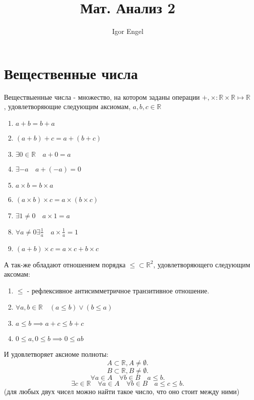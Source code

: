 \documentclass[11pt, oneside]{article}   	%
\title{Мат. Анализ 2}
\author{Igor Engel}
\date{}
\begin{document}
\maketitle
\section{Вещественные числа}
\begin{definition}
    Веществыенные числа - множество, на котором заданы операции $+, \times : \mathbb{R} \times \mathbb{R} \mapsto \mathbb{R}$, удовлетворяющие следующим аксиомам, $a, b, c \in \mathbb{R}$
    \begin{enumerate}
        \item $ a+b=b+a$
        \item $ \left( a+b \right) +c = a+\left( b+c \right)$
        \item $ \exists 0 \in \mathbb{R}\quad a + 0 = a$
        \item $\exists -a\quad a+(-a)=0$
        \item $ a\times b = b\times a$
        \item $ \left( a\times b \right) \times c = a \times \left( b \times c \right)$
        \item $ \exists 1\neq 0\quad a\times 1 = a$
        \item $ \forall{a \neq 0}\exists \frac{1}{a}\quad a\times \frac{1}{a} = 1$
        \item $(a+b)\times c = a\times c+b\times c$
    \end{enumerate}
    А так-же обладают отношением порядка $\le \subset \mathbb{R}^2$, удовлетворяющего следующим аксомам:
    \begin{enumerate}
        \item $\le$ - рефлексивное антисимметричное транзитивное отношение.
        \item $\forall{a, b \in \mathbb{R}}\quad (a\le b)\lor (b\le a)$
        \item $a\le b \implies a + c \le b + c$
        \item $0 \le a, 0 \le b \implies 0 \le ab$
    \end{enumerate}
    И удовлетворяет аксиоме полноты:
    \[ A \subset \mathbb{R}, A \neq \emptyset .\]
    \[ B \subset \mathbb{R}, B \neq \emptyset .\] 
    \[ \forall{a \in A}\quad \forall{b \in B}\quad a \le b .\]
    \[ \exists{c \in \mathbb{R}}\quad \forall{a \in A}\quad \forall{b \in B}\quad a \le c \le b .\]
    (для любых двух чисел можно найти такое число, что оно стоит между ними)
\end{definition}
\end{document}
